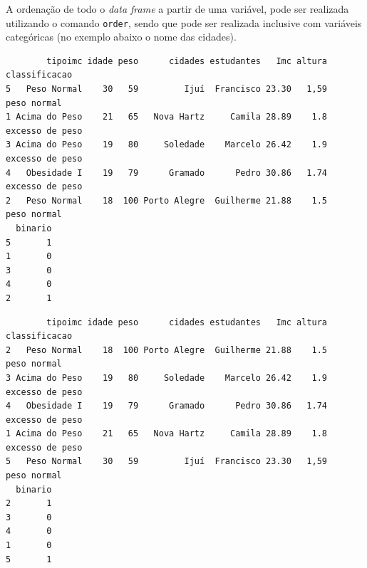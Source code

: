 \documentclass[12pt,brazil,oneside]{book}
\newenvironment{Shaded}{\begin{snugshade}}{\end{snugshade}}
\newcommand{\CommentTok}[1]{\textcolor[rgb]{0.56,0.35,0.01}{\textit{#1}}}
\newcommand{\DataTypeTok}[1]{\textcolor[rgb]{0.13,0.29,0.53}{#1}}
\newcommand{\KeywordTok}[1]{\textcolor[rgb]{0.13,0.29,0.53}{\textbf{#1}}}
\newcommand{\NormalTok}[1]{#1}
\newcommand{\OperatorTok}[1]{\textcolor[rgb]{0.81,0.36,0.00}{\textbf{#1}}}
\newcommand{\OtherTok}[1]{\textcolor[rgb]{0.56,0.35,0.01}{#1}}
\begin{document}
A ordenação de todo o \emph{data frame} a partir de uma variável, pode
ser realizada utilizando o comando \texttt{order}, sendo que pode ser
realizada inclusive com variáveis categóricas (no exemplo abaixo o nome
das cidades).

\begin{Shaded}
\end{Shaded}

\begin{verbatim}
        tipoimc idade peso      cidades estudantes   Imc altura   classificacao
5   Peso Normal    30   59         Ijuí  Francisco 23.30   1,59     peso normal
1 Acima do Peso    21   65   Nova Hartz     Camila 28.89    1.8 excesso de peso
3 Acima do Peso    19   80     Soledade    Marcelo 26.42    1.9 excesso de peso
4   Obesidade I    19   79      Gramado      Pedro 30.86   1.74 excesso de peso
2   Peso Normal    18  100 Porto Alegre  Guilherme 21.88    1.5     peso normal
  binario
5       1
1       0
3       0
4       0
2       1
\end{verbatim}

\begin{Shaded}
\end{Shaded}

\begin{verbatim}
        tipoimc idade peso      cidades estudantes   Imc altura   classificacao
2   Peso Normal    18  100 Porto Alegre  Guilherme 21.88    1.5     peso normal
3 Acima do Peso    19   80     Soledade    Marcelo 26.42    1.9 excesso de peso
4   Obesidade I    19   79      Gramado      Pedro 30.86   1.74 excesso de peso
1 Acima do Peso    21   65   Nova Hartz     Camila 28.89    1.8 excesso de peso
5   Peso Normal    30   59         Ijuí  Francisco 23.30   1,59     peso normal
  binario
2       1
3       0
4       0
1       0
5       1
\end{verbatim}

\begin{Shaded}
\end{Shaded}
\end{document}
